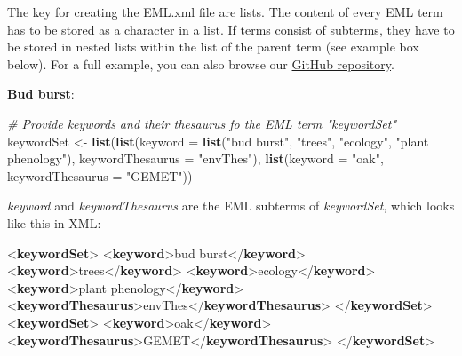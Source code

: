 \documentclass[
]{book}
\newenvironment{Shaded}{\begin{snugshade}}{\end{snugshade}}
\newcommand{\AttributeTok}[1]{\textcolor[rgb]{0.13,0.29,0.53}{#1}}
\newcommand{\CommentTok}[1]{\textcolor[rgb]{0.56,0.35,0.01}{\textit{#1}}}
\newcommand{\FunctionTok}[1]{\textcolor[rgb]{0.13,0.29,0.53}{\textbf{#1}}}
\newcommand{\KeywordTok}[1]{\textcolor[rgb]{0.13,0.29,0.53}{\textbf{#1}}}
\newcommand{\NormalTok}[1]{#1}
\newcommand{\OtherTok}[1]{\textcolor[rgb]{0.56,0.35,0.01}{#1}}
\newcommand{\StringTok}[1]{\textcolor[rgb]{0.31,0.60,0.02}{#1}}
\begin{document}
The key for creating the EML.xml file are lists. The content of every EML term has to be stored as a character in a list. If terms consist of subterms, they have to be stored in nested lists within the list of the parent term (see example box below). For a full example, you can also browse our \href{https://github.com/LTER-LIFE/FDFDT}{GitHub repository}.

\textbf{Bud burst}:

\begin{Shaded}
\begin{Highlighting}[]
\CommentTok{\# Provide keywords and their thesaurus fo the EML term "keywordSet"}
\NormalTok{keywordSet }\OtherTok{\textless{}{-}} \FunctionTok{list}\NormalTok{(}\FunctionTok{list}\NormalTok{(}\AttributeTok{keyword =} \FunctionTok{list}\NormalTok{(}\StringTok{"bud burst"}\NormalTok{, }\StringTok{"trees"}\NormalTok{, }\StringTok{"ecology"}\NormalTok{, }\StringTok{"plant phenology"}\NormalTok{),}
                      \AttributeTok{keywordThesaurus =} \StringTok{"envThes"}\NormalTok{),}
                 \FunctionTok{list}\NormalTok{(}\AttributeTok{keyword =} \StringTok{"oak"}\NormalTok{,}
                      \AttributeTok{keywordThesaurus =} \StringTok{"GEMET"}\NormalTok{))}
\end{Highlighting}
\end{Shaded}

\emph{keyword} and \emph{keywordThesaurus} are the EML subterms of \emph{keywordSet}, which looks like this in XML:

\begin{Shaded}
\begin{Highlighting}[]
\NormalTok{\textless{}}\KeywordTok{keywordSet}\NormalTok{\textgreater{}}
\NormalTok{  \textless{}}\KeywordTok{keyword}\NormalTok{\textgreater{}bud burst\textless{}/}\KeywordTok{keyword}\NormalTok{\textgreater{}}
\NormalTok{  \textless{}}\KeywordTok{keyword}\NormalTok{\textgreater{}trees\textless{}/}\KeywordTok{keyword}\NormalTok{\textgreater{}}
\NormalTok{  \textless{}}\KeywordTok{keyword}\NormalTok{\textgreater{}ecology\textless{}/}\KeywordTok{keyword}\NormalTok{\textgreater{}}
\NormalTok{  \textless{}}\KeywordTok{keyword}\NormalTok{\textgreater{}plant phenology\textless{}/}\KeywordTok{keyword}\NormalTok{\textgreater{}}
\NormalTok{  \textless{}}\KeywordTok{keywordThesaurus}\NormalTok{\textgreater{}envThes\textless{}/}\KeywordTok{keywordThesaurus}\NormalTok{\textgreater{}}
\NormalTok{\textless{}/}\KeywordTok{keywordSet}\NormalTok{\textgreater{}}
\NormalTok{\textless{}}\KeywordTok{keywordSet}\NormalTok{\textgreater{}}
\NormalTok{  \textless{}}\KeywordTok{keyword}\NormalTok{\textgreater{}oak\textless{}/}\KeywordTok{keyword}\NormalTok{\textgreater{}}
\NormalTok{  \textless{}}\KeywordTok{keywordThesaurus}\NormalTok{\textgreater{}GEMET\textless{}/}\KeywordTok{keywordThesaurus}\NormalTok{\textgreater{}}
\NormalTok{\textless{}/}\KeywordTok{keywordSet}\NormalTok{\textgreater{}}
\end{Highlighting}
\end{Shaded}
\end{document}
